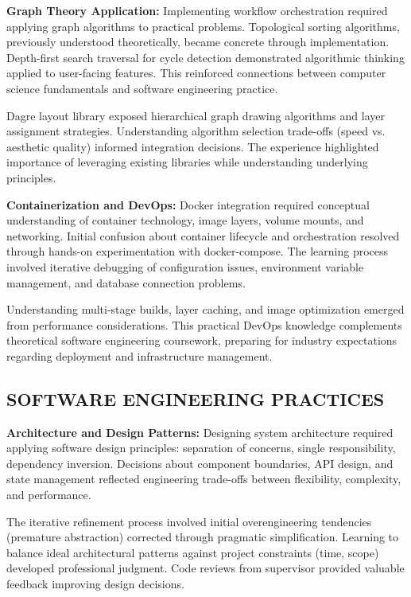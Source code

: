 \documentclass[12pt]{article}
\begin{document}
\hspace{\parindent}\textbf{Graph Theory Application:} Implementing workflow orchestration required applying graph algorithms to practical problems. Topological sorting algorithms, previously understood theoretically, became concrete through implementation. Depth-first search traversal for cycle detection demonstrated algorithmic thinking applied to user-facing features. This reinforced connections between computer science fundamentals and software engineering practice.

Dagre layout library exposed hierarchical graph drawing algorithms and layer assignment strategies. Understanding algorithm selection trade-offs (speed vs. aesthetic quality) informed integration decisions. The experience highlighted importance of leveraging existing libraries while understanding underlying principles.

\hspace{\parindent}\textbf{Containerization and DevOps:} Docker integration required conceptual understanding of container technology, image layers, volume mounts, and networking. Initial confusion about container lifecycle and orchestration resolved through hands-on experimentation with docker-compose. The learning process involved iterative debugging of configuration issues, environment variable management, and database connection problems.

Understanding multi-stage builds, layer caching, and image optimization emerged from performance considerations. This practical DevOps knowledge complements theoretical software engineering coursework, preparing for industry expectations regarding deployment and infrastructure management.

\subsection{SOFTWARE ENGINEERING PRACTICES}

\hspace{\parindent}\textbf{Architecture and Design Patterns:} Designing system architecture required applying software design principles: separation of concerns, single responsibility, dependency inversion. Decisions about component boundaries, API design, and state management reflected engineering trade-offs between flexibility, complexity, and performance.

The iterative refinement process involved initial overengineering tendencies (premature abstraction) corrected through pragmatic simplification. Learning to balance ideal architectural patterns against project constraints (time, scope) developed professional judgment. Code reviews from supervisor provided valuable feedback improving design decisions.
\end{document}

